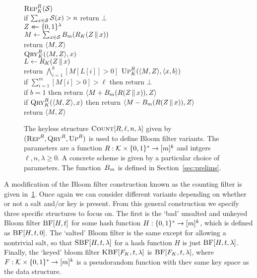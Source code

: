 \begin{figure}
  {
    \underline{$\textnormal{\textsc{Rep}}^R_K(\mathcal{S})$}\\[2pt]
      if $\sum_{x \in \mathcal{S}} \mathcal{S}(x) > n$ return $\bot$\\
      $Z \mathrel{\leftarrow\mkern-14mu\leftarrow} \{0,1\}^\lambda$\\
      $M \gets \sum_{x \in \mathcal{S}} {B}_m(R_K(Z \, \| \, x))$\\
      return $\langle M, Z \rangle$
    \\[6pt]
      \underline{$\textnormal{\textsc{Qry}}^R_K(\langle M, Z \rangle,x)$}\\[2pt]
      $L \gets R_K(Z \, \| \, x)$\\
      return $\bigwedge_{i=1}^k [M[L[i]] > 0]$
  }
  {
    \underline{$\textnormal{\textsc{Up}}^R_K(\langle M, Z \rangle,\langle x, b \rangle)$}\\[2pt]
      if $\sum_{i=1}^m [M[i] > 0] > \ell$ then return $\bot$\\
      if $b = 1$ then return $\langle M + {B}_m(R(Z \, \| \, x)), Z \rangle$\\
      if $\textnormal{\textsc{Qry}}^R_K(\langle M, Z \rangle, x)$ then return $\langle M - {B}_m(R(Z \, \| \, x)), Z \rangle$\\
      return $\langle M, Z \rangle$
  }
  \caption{The keyless structure $\textnormal{\textsc{Count}}[R,\ell,n,\lambda]$ given by
  $(\textnormal{\textsc{Rep}}^R,\textnormal{\textsc{Qry}}^R,\textnormal{\textsc{Up}}^R)$ is used to define Bloom filter variants. The
  parameters are a function $R: \mathcal{K}\times\{0,1\}^* \to [m]^k$ and intgers $\ell, n,
  \lambda \geq0$. A concrete scheme is given by a particular choice of
  parameters.  The function~${B}_m$ is defined in
  Section~\ref{sec:prelims}.}
  \label{fig:cbf-def}
\end{figure}

A modification of the Bloom filter construction known as the counting filter is given in~\ref{fig:cbf-def}. Once again we can consider different variants depending on whether or not a salt and/or key is present. From this
general construction we specify three specific structures to focus on. The first
is the `bad' unsalted and unkeyed Bloom filter $\textnormal{\textsc{BF}}[H,t]$ for some hash
function $H: \{0,1\}^* \to [m]^k$, which is defined as $\textnormal{\textsc{BF}}[H,t,0]$. The `salted'
Bloom filter is the same except for allowing a nontrivial salt, so that
$\textnormal{\textsc{SBF}}[H,t,\lambda]$ for a hash function $H$ is just $\textnormal{\textsc{BF}}[H,t,\lambda]$. Finally,
the `keyed' bloom filter $\textnormal{\textsc{KBF}}[F_K,t,\lambda]$ is $\textnormal{\textsc{BF}}[F_K,t,\lambda]$, where
$F: \mathcal{K} \times \{0,1\}^* \to [m]^k$ is a pseudorandom function with thev same key space as the data structure.

